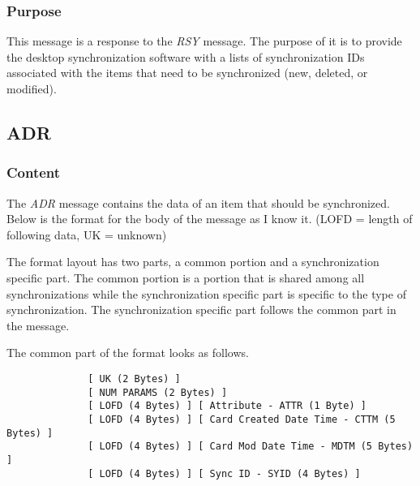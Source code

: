             \subsubsection{Purpose}

            This message is a response to the \emph{RSY} message. The purpose
            of it is to provide the desktop synchronization software with a
            lists of synchronization IDs associated with the items that need to
            be synchronized (new, deleted, or modified).

        \subsection{ADR}

            \subsubsection{Content}

            The \emph{ADR} message contains the data of an item that should be
            synchronized. Below is the format for the body of the message as I
            know it. (LOFD = length of following data, UK = unknown)

            The format layout has two parts, a common portion and a
            synchronization specific part. The common portion is a portion
            that is shared among all synchronizations while the
            synchronization specific part is specific to the type of
            synchronization. The synchronization specific part follows the
            common part in the message.

            The common part of the format looks as follows.

            \begin{verbatim}
              [ UK (2 Bytes) ]
              [ NUM PARAMS (2 Bytes) ]
              [ LOFD (4 Bytes) ] [ Attribute - ATTR (1 Byte) ]
              [ LOFD (4 Bytes) ] [ Card Created Date Time - CTTM (5 Bytes) ]
              [ LOFD (4 Bytes) ] [ Card Mod Date Time - MDTM (5 Bytes) ]
              [ LOFD (4 Bytes) ] [ Sync ID - SYID (4 Bytes) ]
            \end{verbatim}

